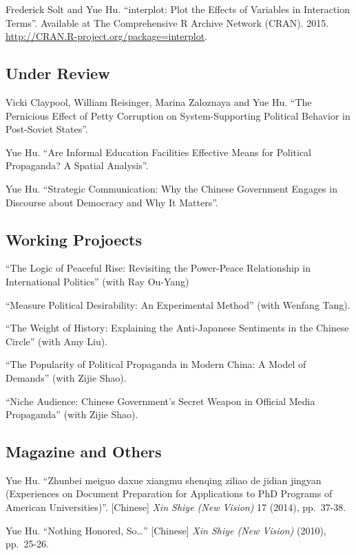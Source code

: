 \documentclass[10.5pt,]{article}
\begin{document}
Frederick Solt and Yue Hu. ``interplot: Plot the Effects of Variables in
Interaction Terms''. Available at The Comprehensive R Archive Network
(CRAN). 2015. \url{http://CRAN.R-project.org/package=interplot}.

\subsection{Under Review}\label{under-review}

Vicki Claypool, William Reisinger, Marina Zaloznaya and Yue Hu. ``The
Pernicious Effect of Petty Corruption on System-Supporting Political
Behavior in Post-Soviet States''.

Yue Hu. ``Are Informal Education Facilities Effective Means for
Political Propaganda? A Spatial Analysis''.

Yue Hu. ``Strategic Communication: Why the Chinese Government Engages in
Discourse about Democracy and Why It Matters''.

\subsection{Working Projoects}\label{working-projoects}

``The Logic of Peaceful Rise: Revisiting the Power-Peace Relationship in
International Politics'' (with Ray Ou-Yang)

``Measure Political Desirability: An Experimental Method'' (with Wenfang
Tang).

``The Weight of History: Explaining the Anti-Japanese Sentiments in the
Chinese Circle'' (with Amy Liu).

``The Popularity of Political Propaganda in Modern China: A Model of
Demands'' (with Zijie Shao).

``Niche Audience: Chinese Government's Secret Weapon in Official Media
Propaganda'' (with Zijie Shao).

\subsection{Magazine and Others}\label{magazine-and-others}

Yue Hu. ``Zhunbei meiguo daxue xiangmu shenqing ziliao de jidian jingyan
(Experiences on Document Preparation for Applications to PhD Programs of
American Universities)''. {[}Chinese{]} \emph{Xin Shiye (New Vision)} 17
(2014), pp.~37-38.

Yue Hu. ``Nothing Honored, So\ldots{}'' {[}Chinese{]}
\emph{Xin Shiye (New Vision)} (2010), pp.~25-26.
\end{document}
